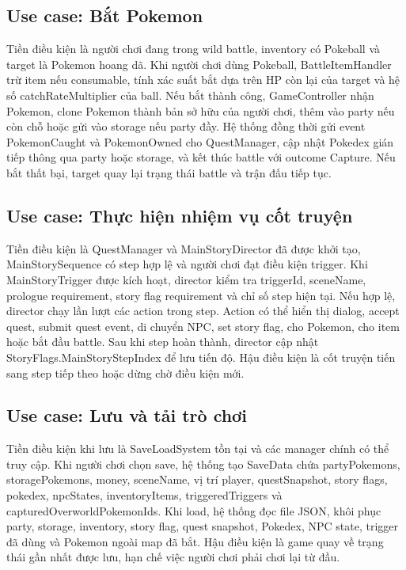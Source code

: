 \subsection{Use case: Bắt Pokemon}

Tiền điều kiện là người chơi đang trong wild battle, inventory có Pokeball và target là Pokemon hoang dã. Khi người chơi dùng Pokeball, BattleItemHandler trừ item nếu consumable, tính xác suất bắt dựa trên HP còn lại của target và hệ số catchRateMultiplier của ball. Nếu bắt thành công, GameController nhận Pokemon, clone Pokemon thành bản sở hữu của người chơi, thêm vào party nếu còn chỗ hoặc gửi vào storage nếu party đầy. Hệ thống đồng thời gửi event PokemonCaught và PokemonOwned cho QuestManager, cập nhật Pokedex gián tiếp thông qua party hoặc storage, và kết thúc battle với outcome Capture. Nếu bắt thất bại, target quay lại trạng thái battle và trận đấu tiếp tục.

\subsection{Use case: Thực hiện nhiệm vụ cốt truyện}

Tiền điều kiện là QuestManager và MainStoryDirector đã được khởi tạo, MainStorySequence có step hợp lệ và người chơi đạt điều kiện trigger. Khi MainStoryTrigger được kích hoạt, director kiểm tra triggerId, sceneName, prologue requirement, story flag requirement và chỉ số step hiện tại. Nếu hợp lệ, director chạy lần lượt các action trong step. Action có thể hiển thị dialog, accept quest, submit quest event, di chuyển NPC, set story flag, cho Pokemon, cho item hoặc bắt đầu battle. Sau khi step hoàn thành, director cập nhật StoryFlags.MainStoryStepIndex để lưu tiến độ. Hậu điều kiện là cốt truyện tiến sang step tiếp theo hoặc dừng chờ điều kiện mới.

\subsection{Use case: Lưu và tải trò chơi}

Tiền điều kiện khi lưu là SaveLoadSystem tồn tại và các manager chính có thể truy cập. Khi người chơi chọn save, hệ thống tạo SaveData chứa partyPokemons, storagePokemons, money, sceneName, vị trí player, questSnapshot, story flags, pokedex, npcStates, inventoryItems, triggeredTriggers và capturedOverworldPokemonIds. Khi load, hệ thống đọc file JSON, khôi phục party, storage, inventory, story flag, quest snapshot, Pokedex, NPC state, trigger đã dùng và Pokemon ngoài map đã bắt. Hậu điều kiện là game quay về trạng thái gần nhất được lưu, hạn chế việc người chơi phải chơi lại từ đầu.

